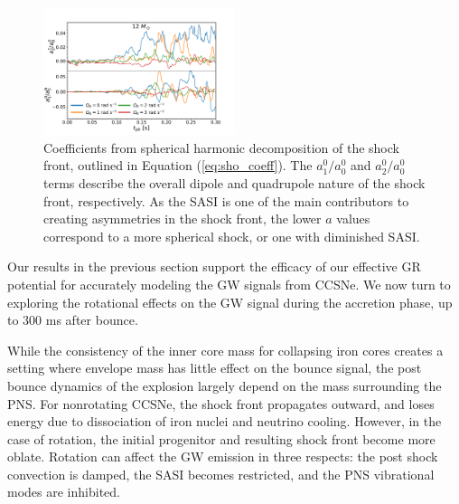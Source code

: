 \documentclass[twocolumn,times]{aastex62}  %
\begin{document}
\begin{figure}
    \centering
    \includegraphics[width=0.5\textwidth]{figures/sasi_axis_norm.pdf}
    \caption{Coefficients from spherical harmonic decomposition of the shock front, outlined in Equation (\ref{eq:sho_coeff}).  The $a_1^0/a_0^0$ and $a_2^0/a_0^0$ terms describe the overall dipole and quadrupole nature of the shock front, respectively.  As the SASI is one of the main contributors to creating asymmetries in the shock front, the lower $a$ values correspond to a more spherical shock, or one with diminished SASI.}
    \label{fig:sasi}
\end{figure}

Our results in the previous section support the efficacy of our effective GR potential for accurately modeling the GW signals from CCSNe.
We now turn to exploring the rotational effects on the GW signal during the accretion phase, up to 300 ms after bounce.


While the consistency of the inner core mass for collapsing iron cores creates a setting where envelope mass has little effect on the bounce signal, the post bounce dynamics of the explosion largely depend on the mass surrounding the PNS.  For nonrotating CCSNe, the shock front propagates outward, and loses energy due to dissociation of iron nuclei and neutrino cooling.  However, in the case of rotation, the initial progenitor and resulting shock front become more oblate.  Rotation can affect the GW emission in three respects: the post shock convection is damped, the SASI becomes restricted, and the PNS vibrational modes are inhibited. 
\end{document}
